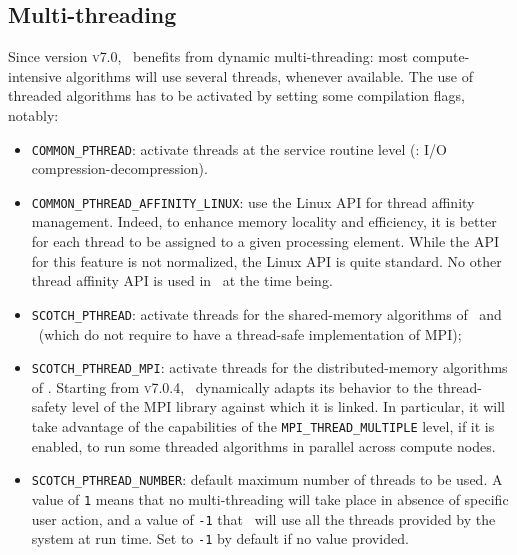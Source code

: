 \begin{center}
\end{center}

\subsection{Multi-threading}
\label{sec-execution-multithreading}

Since version \textsc{v7.0}, \scotch\ benefits from dynamic
multi-threading: most compute-intensive algorithms will use several
threads, whenever available. The use of threaded algorithms has to be
activated by setting some compilation flags, notably:
\begin{itemize}
\item
\texttt{COMMON\_PTHREAD}: activate threads at the service routine
level (\eg: I/O compression-decompression).
\item
\texttt{COMMON\_\lbt PTHREAD\_\lbt AFFINITY\_\lbt LINUX}: use
the Linux API for thread affinity management. Indeed, to enhance
memory locality and efficiency, it is better for each thread to be
assigned to a given processing element. While the API for this feature
is not normalized, the Linux API is quite standard. No other thread
affinity API is used in \scotch\ at the time being.
\item
\texttt{SCOTCH\_PTHREAD}: activate threads for the shared-memory
algorithms of \scotch\ and \ptscotch\ (which do not require to have
a thread-safe implementation of MPI);
\item
\texttt{SCOTCH\_PTHREAD\_MPI}: activate threads for the
distributed-memory algorithms of \ptscotch. Starting from
\textsc{v7.0.4}, \ptscotch\ dynamically adapts its behavior to the
thread-safety level of the MPI library against which it is linked. In
particular, it will take advantage of the capabilities of the
\texttt{MPI\_\lbt THREAD\_\lbt MULTIPLE} level, if it is enabled, to
run some threaded algorithms in parallel across compute nodes.
\item
\texttt{SCOTCH\_PTHREAD\_NUMBER}: default maximum number of threads to
be used. A value of \texttt{1} means that no multi-threading will take
place in absence of specific user action, and a value of \texttt{-1}
that \scotch\ will use all the threads provided by the system at run
time. Set to \texttt{-1} by default if no value provided.
\end{itemize}
